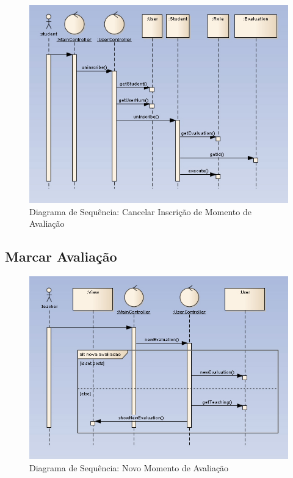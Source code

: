 \begin{figure}[!htbp]
\centering
\includegraphics{imagens/cancelar_inscricao.jpg}
\caption{Diagrama de Sequência: Cancelar Inscrição de Momento de Avaliação}
\label{fig:cancelar_inscricao}
\end{figure}





\clearpage
\subsection{Marcar Avaliação}

\begin{figure}[!htbp]
\centering
\includegraphics{imagens/nova_avaliacao.jpg}
\caption{Diagrama de Sequência: Novo Momento de Avaliação}
\label{fig:nova_avaliacao}
\end{figure}

